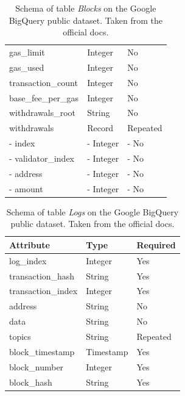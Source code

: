 \begin{table}[H]
\begin{tabular}  { m{6cm} m{3cm} m{3cm} }
    gas\_limit & Integer & No\\ %
    gas\_used & Integer & No\\ %
    transaction\_count & Integer & No\\ %
    base\_fee\_per\_gas & Integer & No\\ %
    withdrawals\_root & String & No\\ %
    withdrawals & Record & Repeated\\ %
    \quad- index & \quad- Integer & \quad- No\\ %
    \quad- validator\_index & \quad- Integer & \quad- No\\ %
    \quad- address & \quad- Integer & \quad- No\\ %
    \quad- amount & \quad- Integer & \quad- No\\ %
    \bottomrule
\end{tabular}
\caption[Google BigQuery \texttt{Blocks} table]{Schema of table \textit{Blocks} on the Google BigQuery public dataset. Taken from the official docs.}
\label{table:bigquery-blocks}
\end{table}

\begin{table}[H]
\centering
    \begin{tabular}  { m{6cm} m{3cm} m{3cm} } 
    \toprule
    \textbf{Attribute} & \textbf{Type} & \textbf{Required} \\
    \midrule
    log\_index & Integer	& Yes \\
    transaction\_hash & String & Yes \\
    transaction\_index & Integer & Yes	\\		
    address & String & No \\
    data & String & No \\
    topics & String & Repeated \\
    block\_timestamp & Timestamp & Yes \\ 
    block\_number & Integer & Yes \\
    block\_hash & String & Yes \\
    \bottomrule
\end{tabular}
\caption[Google BigQuery \texttt{Logs} table]{Schema of table \textit{Logs} on the Google BigQuery public dataset. Taken from the official docs.}
\label{table:bigquery-logs}
\end{table}


